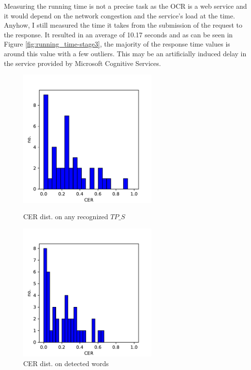 Measuring the running time is not a precise task as the OCR is a web service and it would depend on the network congestion and the service's load at the time. Anyhow, I still measured the time it takes from the submission of the request to the response. It resulted in an average of 10.17 seconds and as can be seen in Figure \ref{fig:running_time-stage3}, the majority of the response time values is around this value with a few outliers. This may be an artificially induced delay in the service provided by Microsoft Cognitive Services.

\begin{figure}
    \centering
    \begin{minipage}[c]{0.5\linewidth}
        \centering
        \includegraphics[height=7cm, keepaspectratio]{img/evaluation/CER_on_recognized-stage3.pdf}
            \caption{CER dist. on any recognized $TP\_S$}
            \label{fig:CER_on_arecognized-stage3}
    \end{minipage}\hfill
    \begin{minipage}[c]{0.5\linewidth}
        \centering
        \includegraphics[height=7cm, keepaspectratio]{img/evaluation/CER_on_recognized_words-stage3.pdf}
            \caption{CER dist. on detected words}
            \label{fig:CER_on_recognized_words-stage3}
    \end{minipage}\hfill
\end{figure}

